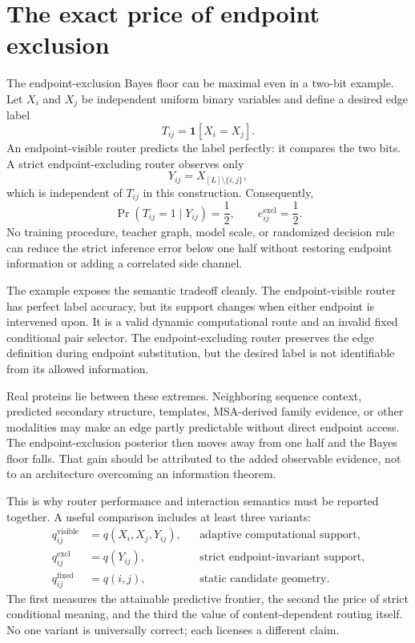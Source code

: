 \section*{The exact price of endpoint exclusion}

The endpoint-exclusion Bayes floor can be maximal even in a two-bit example.  Let $X_i$ and $X_j$ be independent
uniform binary variables and define a desired edge label
\begin{equation}
T_{ij}=\mathbf1[X_i=X_j].
\label{eq:book-endpoint-label}
\end{equation}
An endpoint-visible router predicts the label perfectly: it compares the two bits.  A strict endpoint-excluding
router observes only
\begin{equation}
Y_{ij}=X_{[L]\setminus\{i,j\}},
\end{equation}
which is independent of $T_{ij}$ in this construction.  Consequently,
\begin{equation}
\Pr(T_{ij}=1\mid Y_{ij})=\frac12,
\qquad
e_{ij}^{\mathrm{excl}}=\frac12.
\label{eq:book-maximal-cavity-floor}
\end{equation}
No training procedure, teacher graph, model scale, or randomized decision rule can reduce the
strict inference error below one half without restoring endpoint information or adding a correlated
side channel.

The example exposes the semantic tradeoff cleanly.  The endpoint-visible router has perfect label
accuracy, but its support changes when either endpoint is intervened upon.  It is a valid dynamic
computational route and an invalid fixed conditional pair selector.  The endpoint-excluding router preserves
the edge definition during endpoint substitution, but the desired label is not identifiable from
its allowed information.

Real proteins lie between these extremes.  Neighboring sequence context, predicted secondary
structure, templates, MSA-derived family evidence, or other modalities may make an edge partly
predictable without direct endpoint access.  The endpoint-exclusion posterior then moves away from one half and
the Bayes floor falls.  That gain should be attributed to the added observable evidence, not to an
architecture overcoming an information theorem.

This is why router performance and interaction semantics must be reported together.  A useful
comparison includes at least three variants:
\begin{equation}
\begin{aligned}
q_{ij}^{\mathrm{visible}}&=q(X_i,X_j,Y_{ij}),
&&\text{adaptive computational support},\\
q_{ij}^{\mathrm{excl}}&=q(Y_{ij}),
&&\text{strict endpoint-invariant support},\\
q_{ij}^{\mathrm{fixed}}&=q(i,j),
&&\text{static candidate geometry}.
\end{aligned}
\label{eq:book-router-comparison}
\end{equation}
The first measures the attainable predictive frontier, the second the price of strict conditional
meaning, and the third the value of content-dependent routing itself.  No one variant is universally
correct; each licenses a different claim.
